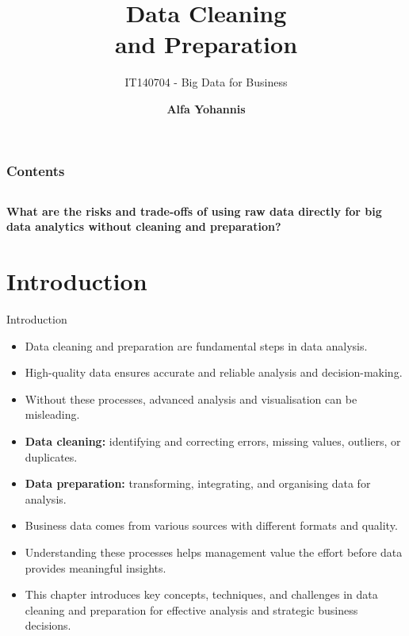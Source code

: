 \documentclass[aspectratio=169, table]{beamer}
\title{\Huge Data Cleaning \\
\vspace{10pt}
and Preparation}
\subtitle{IT140704 - Big Data for Business}
\author{\textbf{Alfa Yohannis}}
\begin{document}
\frame{\titlepage}


\begin{frame}[fragile]
\frametitle{Contents}
\vspace{20pt}
\begin{columns}[t]
	\tableofcontents[sections={1-4}]
	
	\tableofcontents[sections={5-20}]
\end{columns}
\end{frame}

\begin{frame}{\hfill}
	\centering
	\Huge{\textbf{What are the risks and trade-offs of using raw data directly for big data analytics without cleaning and preparation?}}
\end{frame}

\section{Introduction}

\begin{frame}{Introduction}
	\vspace{20pt}
	
	\begin{itemize}
		\item Data cleaning and preparation are fundamental steps in data analysis.
		
		\item High-quality data ensures accurate and reliable analysis and decision-making.
		
		\item Without these processes, advanced analysis and visualisation can be misleading.
		
		\item \textbf{Data cleaning:} identifying and correcting errors, missing values, outliers, or duplicates.
		
		\item \textbf{Data preparation:} transforming, integrating, and organising data for analysis.
		
		\item Business data comes from various sources with different formats and quality.
		
		\item Understanding these processes helps management value the effort before data provides meaningful insights.
		
		\item This chapter introduces key concepts, techniques, and challenges in data cleaning and preparation for effective analysis and strategic business decisions.
	\end{itemize}
	
\end{frame}
\end{document}

